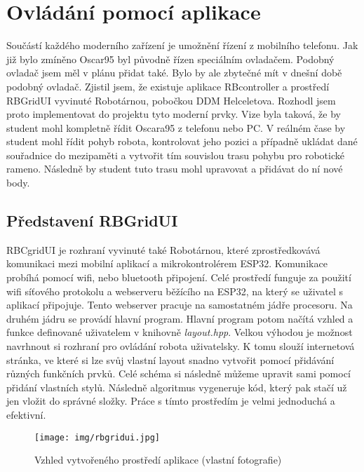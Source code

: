 \chapter{Ovládání pomocí aplikace}
Součástí každého moderního zařízení je umožnění řízení z mobilního telefonu. Jak již bylo zmíněno Oscar95 byl původně řízen speciálním ovladačem. Podobný ovladač jsem měl v plánu přidat také. Bylo by ale zbytečné mít v dnešní době podobný ovladač. Zjistil jsem, že existuje aplikace RBcontroller a prostředí RBGridUI vyvinuté Robotárnou, pobočkou DDM Helceletova. Rozhodl jsem proto implementovat do projektu tyto moderní prvky. Vize byla taková, že by student mohl kompletně řídit Oscara95 z telefonu nebo PC. V reálném čase by student mohl řídit pohyb robota, kontrolovat jeho pozici a případně ukládat dané souřadnice do mezipaměti a vytvořit tím souvislou trasu pohybu pro robotické rameno. Následně by student tuto trasu mohl upravovat a přidávat do ní nové body. \cite{RBController}
\section{Představení RBGridUI}
RBCgridUI je rozhraní vyvinuté také Robotárnou, které zprostředkovává 
komunikaci mezi mobilní aplikací a mikrokontrolérem ESP32. Komunikace probíhá 
pomocí wifi, nebo bluetooth připojení. Celé prostředí funguje za použití wifi síťového protokolu a webserveru běžícího na ESP32, na který 
se uživatel s aplikací připojuje. Tento webserver pracuje na samostatném jádře procesoru. Na 
druhém jádru se provádí hlavní program. Hlavní program potom načítá vzhled a funkce 
definované uživatelem v knihovně \textit{layout.hpp}. Velkou výhodou je možnost navrhnout si rozhraní pro ovládání robota uži\-va\-tel\-sky. K tomu slouží internetová stránka, ve které si lze svůj vlastní layout snadno vytvořit 
pomocí přidávání různých funkčních prvků. Celé schéma si následně můžeme upravit sami 
pomocí přidání vlastních stylů. Následně algoritmus vygeneruje kód, který pak stačí už jen vložit 
do správné složky. Práce s tímto prostředím je velmi jednoduchá a efektivní. \cite{RBGridUI}


\begin{figure}
		\begin{center}
			\texttt{[image: img/rbgridui.jpg]}
			\caption{Vzhled vytvořeného prostředí aplikace (vlastní fotografie)}
			\label{fig:rbgridui}
		\end{center}
		\vspace{0mm}
\end{figure}

